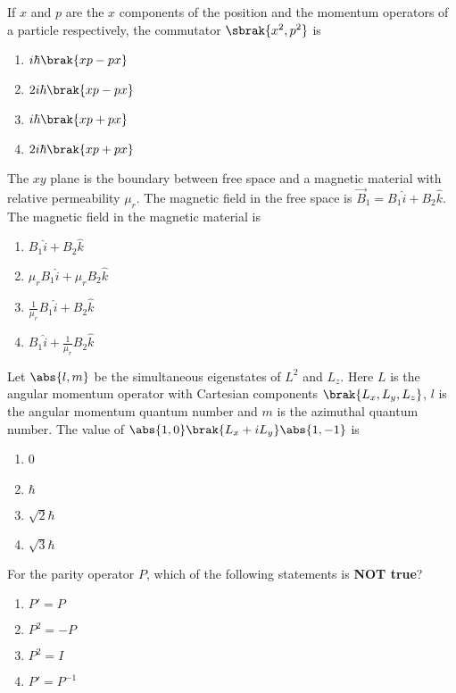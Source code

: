     \item If $x$ and $p$ are the $x$ components of the position and the momentum operators of a particle respectively, the commutator $\sbrak{x^2, p^2}$  
 is

    \begin{enumerate}
        \item $i\hbar\brak{xp - px}$
        \item $2i\hbar\brak{xp - px}$
        \item $i\hbar\brak{xp + px}$
        \item $2i\hbar\brak{xp + px}$
    \end{enumerate}

    \item The $xy$ plane is the boundary between free space and a magnetic material with relative permeability $\mu_r$. The magnetic field in the free space  
 is $\vec{B}_1 = B_1 \hat{i} + B_2 \hat{k}$. The magnetic field in the magnetic material is

    \begin{enumerate}
        \item $B_1 \hat{i} + B_2 \hat{k}$
        \item $\mu_r B_1 \hat{i} + \mu_r B_2 \hat{k}$
        \item $\frac{1}{\mu_r} B_1 \hat{i} + B_2 \hat{k}$
        \item $B_1 \hat{i} + \frac{1}{\mu_r} B_2 \hat{k}$
    \end{enumerate}

    \item Let $\abs{l,m}$ be the simultaneous eigenstates of $L^2$ and $L_z$. Here $L$ is the angular momentum operator with Cartesian components $\brak{L_x, L_y, L_z}$, $l$ is the angular momentum quantum number and $m$ is the azimuthal quantum number. The value of $\abs{1,0}\brak{L_x + iL_y}\abs{1,-1}$ is

    \begin{enumerate}
        \item 0
        \item $\hbar$
        \item $\sqrt{2}\hbar$
        \item $\sqrt{3}\hbar$
    \end{enumerate}

\item For the parity operator $P$, which of the following statements is \textbf{NOT true}?

\begin{enumerate}
    
    \item $P\prime = P$
    \item $P^2 = -P$
    \item $P^2 = I$
    \item $P\prime = P^{-1}$
\end{enumerate}

